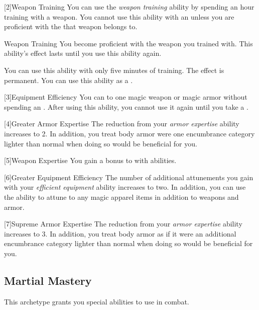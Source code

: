         [2]{Weapon Training} You can use the \textit{weapon training} ability by spending an hour training with a weapon.
        You cannot use this ability with an  unless you are proficient with the  that weapon belongs to.
        \begin{freeability}{Weapon Training}
            You become proficient with the weapon you trained with.
            This ability's effect lasts until you use this ability again.

            \rankline
             You can use this ability with only five minutes of training.
             The effect is permanent.
             You can use this ability as a .
        \end{freeability}

        [3]{Equipment Efficiency} You can  to one magic weapon or magic armor without spending an .
        After using this ability, you cannot use it again until you take a .

        [4]{Greater Armor Expertise}
        The  reduction from your \textit{armor expertise} ability increases to 2.
        In addition, you treat body armor were one encumbrance category lighter than normal when doing so would be beneficial for you.

        [5]{Weapon Expertise} You gain a  bonus to  with  abilities.

        [6]{Greater Equipment Efficiency} The number of additional attunements you gain with your \textit{efficient equipment} ability increases to two.
        In addition, you can use the ability to attune to any magic apparel items in addition to weapons and armor.

        [7]{Supreme Armor Expertise}
        The  reduction from your \textit{armor expertise} ability increases to 3.
        In addition, you treat body armor as if it were an additional encumbrance category lighter than normal when doing so would be beneficial for you.

    \subsection{Martial Mastery}
        This archetype grants you special abilities to use in combat.

